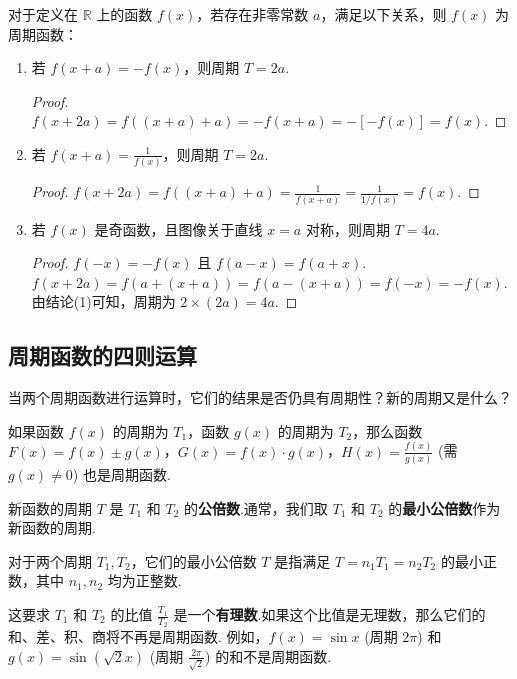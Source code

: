 \begin{theorem}[由函数方程确定周期性]
	对于定义在 $\mathbb{R}$ 上的函数 $f(x)$，若存在非零常数 $a$，满足以下关系，则 $f(x)$ 为周期函数：
	\begin{enumerate}
		\item 若 $f(x+a) = -f(x)$，则周期 $T=2a$.
		\begin{proof}
			$f(x+2a) = f((x+a)+a) = -f(x+a) = -[-f(x)] = f(x)$.
		\end{proof}
		\item 若 $f(x+a) = \frac{1}{f(x)}$，则周期 $T=2a$.
		\begin{proof}
			$f(x+2a) = f((x+a)+a) = \frac{1}{f(x+a)} = \frac{1}{1/f(x)} = f(x)$.
		\end{proof}
		\item 若 $f(x)$ 是奇函数，且图像关于直线 $x=a$ 对称，则周期 $T=4a$.
		\begin{proof}
			$f(-x)=-f(x)$ 且 $f(a-x)=f(a+x)$.
			$f(x+2a) = f(a+(x+a)) = f(a-(x+a)) = f(-x) = -f(x)$.
			由结论(1)可知，周期为 $2 \times (2a) = 4a$.
		\end{proof}
	\end{enumerate}
\end{theorem}

\subsection{周期函数的四则运算}
当两个周期函数进行运算时，它们的结果是否仍具有周期性？新的周期又是什么？

\begin{theorem}[周期函数的和、差、积、商]
	如果函数 $f(x)$ 的周期为 $T_1$，函数 $g(x)$ 的周期为 $T_2$，那么函数 $F(x) = f(x) \pm g(x)$，$G(x) = f(x) \cdot g(x)$，$H(x) = \frac{f(x)}{g(x)}$ (需 $g(x)\neq 0$) 也是周期函数.
	
	新函数的周期 $T$ 是 $T_1$ 和 $T_2$ 的\textbf{公倍数}.通常，我们取 $T_1$ 和 $T_2$ 的\textbf{最小公倍数}作为新函数的周期.
\end{theorem}

\begin{note}[关于公倍数的理解]
	对于两个周期 $T_1, T_2$，它们的最小公倍数 $T$ 是指满足 $T = n_1 T_1 = n_2 T_2$ 的最小正数，其中 $n_1, n_2$ 均为正整数.
	
	这要求 $T_1$ 和 $T_2$ 的比值 $\frac{T_1}{T_2}$ 是一个\textbf{有理数}.如果这个比值是无理数，那么它们的和、差、积、商将不再是周期函数.
	例如，$f(x)=\sin x$ (周期 $2\pi$) 和 $g(x)=\sin(\sqrt{2}x)$ (周期 $\frac{2\pi}{\sqrt{2}}$) 的和不是周期函数.
\end{note}

